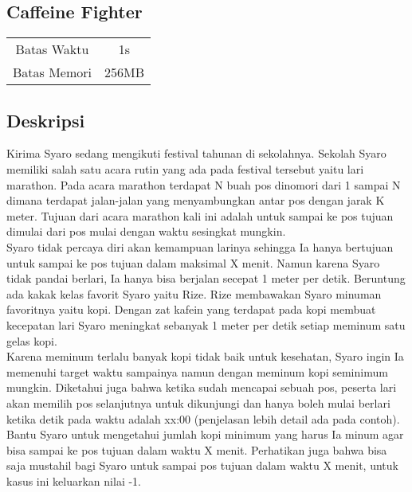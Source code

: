 \documentclass{article}
\begin{document}
\begin{center}

    
    \section*{Caffeine Fighter} %

    \begin{tabular}{ | c c | }
        \hline
        Batas Waktu  & 1s \\    %
        Batas Memori & 256MB \\  %
        \hline
    \end{tabular}
\end{center}

\subsection*{Deskripsi}

Kirima Syaro sedang mengikuti festival tahunan di sekolahnya. Sekolah Syaro memiliki salah satu acara rutin yang ada pada festival tersebut yaitu lari marathon. Pada acara marathon terdapat N buah pos dinomori dari 1 sampai N dimana terdapat jalan-jalan yang menyambungkan antar pos dengan jarak K meter. Tujuan dari acara marathon kali ini adalah untuk sampai ke pos tujuan dimulai dari pos mulai dengan waktu sesingkat mungkin.\\

Syaro tidak percaya diri akan kemampuan larinya sehingga Ia hanya bertujuan untuk sampai ke pos tujuan dalam maksimal X menit. Namun karena Syaro tidak pandai berlari, Ia hanya bisa berjalan secepat 1 meter per detik. Beruntung ada kakak kelas favorit Syaro yaitu Rize. Rize membawakan Syaro minuman favoritnya yaitu kopi. Dengan zat kafein yang terdapat pada kopi membuat kecepatan lari Syaro meningkat sebanyak 1 meter per detik setiap meminum satu gelas kopi.\\

Karena meminum terlalu banyak kopi tidak baik untuk kesehatan, Syaro ingin Ia memenuhi target waktu sampainya namun dengan meminum kopi seminimum mungkin. Diketahui juga bahwa ketika sudah mencapai sebuah pos, peserta lari akan memilih pos selanjutnya untuk dikunjungi dan hanya boleh mulai berlari ketika detik pada waktu adalah xx:00 (penjelasan lebih detail ada pada contoh). Bantu Syaro untuk mengetahui jumlah kopi minimum yang harus Ia minum agar bisa sampai ke pos tujuan dalam waktu X menit. Perhatikan juga bahwa bisa saja mustahil bagi Syaro untuk sampai pos tujuan dalam waktu X menit, untuk kasus ini keluarkan nilai -1.\\
\end{document}
